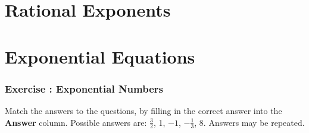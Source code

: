 \section{Rational Exponents}
\section{Exponential Equations}
            \subsubsection{  Exercise : Exponential Numbers }
            \nopagebreak
        \label{m38359*id67549}Match the answers to the questions, by filling in the correct answer into the \textbf{Answer} column.
Possible answers are: $\frac{3}{2}$, 1, $-1$, $-\frac{1}{3}$, 8. Answers may be repeated.\par 
    \setlength\mytablespace{4\tabcolsep}
    \addtolength\mytablespace{3\arrayrulewidth}
    \setlength\mytablewidth{\linewidth}
    \setlength\mytableroom{\mytablewidth}
    \addtolength\mytableroom{-\mytablespace}
    \setlength\myfixedwidth{0pt}
    \setlength\mystarwidth{\mytableroom}
        \addtolength\mystarwidth{-\myfixedwidth}
        \divide{}
